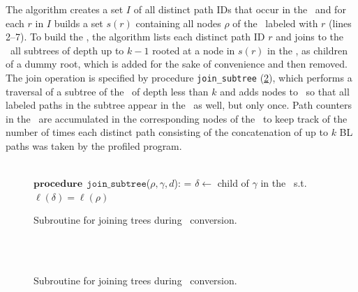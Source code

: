 \noindent The algorithm creates a set $I$ of all distinct path IDs that occur in the \ksf\ and for each $r$ in $I$ builds a set $s(r)$ containing all nodes $\rho$ of the \ksf\ labeled with $r$ (lines 2--7). To build the \kipf, the algorithm lists each distinct path ID $r$ and joins to the \kipf\ all subtrees of depth up to $k-1$ rooted at a node in $s(r)$ in the \ksf, as children of a dummy root, which is added for the sake of convenience and then removed. The join operation is specified by procedure {\tt join\_subtree} (\myalgorithm\ref{alg:kblpp-join-subtrees}), which performs a traversal of a subtree of the \ksf\ of depth less than $k$ and adds nodes to \kipf\ so that all labeled paths in the subtree appear in the \kipf\ as well, but only once. Path counters in the \ksf\ are accumulated in the corresponding nodes of the \kipf\ to keep track of the number of times each distinct path consisting of the concatenation of up to $k$ BL paths was taken by the profiled program.

\ifdefined\noauthorea
\begin{figure}[ht!]
\IncMargin{2em}
\begin{algorithm}[H]
\DontPrintSemicolon
\LinesNumbered
\SetAlgoNoLine
\SetNlSkip{1em} 
\Indm\Indmm
\hrulefill\\
$\mathbf{procedure} \> \> \texttt{join\_subtree}$($\rho,\gamma,d$):\;
\vspace{1mm}
\everypar={\nl}
\Indp\Indpp
$\delta\gets$ child of $\gamma$ in the \kipf\ s.t. $\ell(\delta)=\ell(\rho)$\;
\vspace{-2mm}
\Indm\Indmm
\nonl\hrulefill\vspace{1mm}\\
\DecMargin{1.0em}
\caption{\label{alg:kblpp-join-subtrees} Subroutine for joining trees during \ksf\ conversion.}
\DecMargin{1.0em}
\end{algorithm}
\end{figure}

\else
\begin{figure}[ht]
\caption{\label{alg:kblpp-join-subtrees} Subroutine for joining trees during \ksf\ conversion.}
\begin{small}
\begin{minipage}{0.9\textwidth}
\hrulefill\\
\algmissing\

\vspace{-1mm}
\hrulefill
\vspace{-2mm}
\end{minipage}
\end{small}
\end{figure}
\fi


